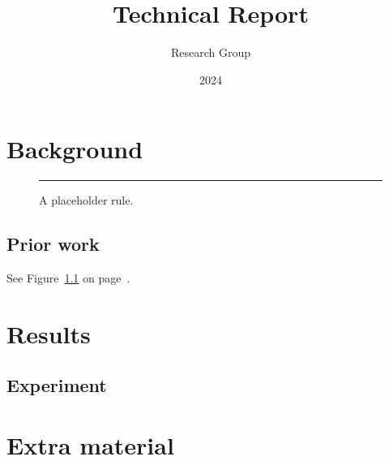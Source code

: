 \documentclass[a4paper]{report}
\begin{document}
\title{Technical Report}\author{Research Group}\date{2024}
\maketitle
\tableofcontents
\listoffigures
\chapter{Background}
\lipsum[1-3]
\begin{figure}[ht]\centering\rule{6cm}{3cm}\caption{A placeholder rule.}\label{fig:rule}\end{figure}
\section{Prior work}
\lipsum[4-5] See Figure~\ref{fig:rule} on page~\pageref{fig:rule}.
\chapter{Results}
\section{Experiment}
\lipsum[6-8]
\appendix
\chapter{Extra material}
\lipsum[9]
\end{document}
